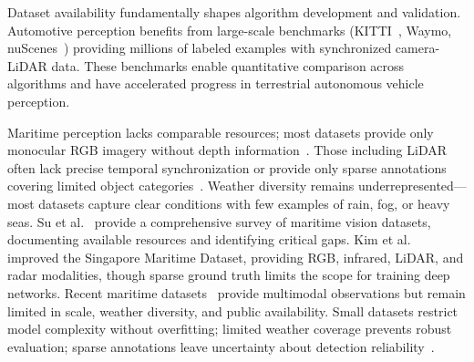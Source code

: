 \documentclass{erauthesis}
\begin{document}
Dataset availability fundamentally shapes algorithm development and validation.
Automotive perception benefits from large-scale benchmarks (KITTI~\cite{geiger2013}, Waymo, nuScenes~\cite{caesar2020}) providing millions of labeled examples with synchronized camera-LiDAR data.
These benchmarks enable quantitative comparison across algorithms and have accelerated progress in terrestrial autonomous vehicle perception.

Maritime perception lacks comparable resources; most datasets provide only monocular RGB imagery without depth information~\cite{su2023}.
Those including \ac{LiDAR} often lack precise temporal synchronization or provide only sparse annotations covering limited object categories~\cite{su2023}.
Weather diversity remains underrepresented—most datasets capture clear conditions with few examples of rain, fog, or heavy seas.
Su et al.~\cite{su2023} provide a comprehensive survey of maritime vision datasets, documenting available resources and identifying critical gaps.
Kim et al.~\cite{kim2022} improved the Singapore Maritime Dataset, providing RGB, infrared, \ac{LiDAR}, and radar modalities, though sparse ground truth limits the scope for training deep networks.
Recent maritime datasets~\cite{thompson2023} provide multimodal observations but remain limited in scale, weather diversity, and public availability.
Small datasets restrict model complexity without overfitting; limited weather coverage prevents robust evaluation; sparse annotations leave uncertainty about detection reliability~\cite{su2023}.
\end{document}
